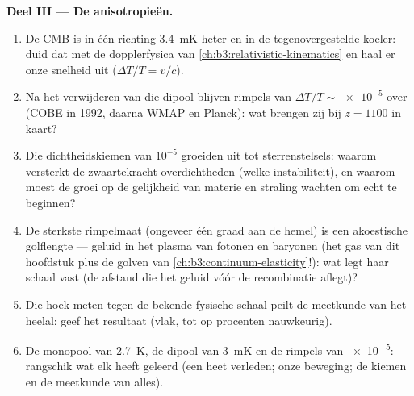\begin{problem}
\medskip\noindent\textbf{Deel III --- De anisotropieën.}
\begin{enumerate}[resume]
  \item De CMB is in één richting \qty{3.4}{mK} heter en in de
        tegenovergestelde koeler: duid dat met de dopplerfysica van
        \cref{ch:b3:relativistic-kinematics} en haal er onze snelheid uit
        ($\Delta T/T = v/c$).
  \item Na het verwijderen van die dipool blijven rimpels van $\Delta T/T \sim
        \num{e-5}$ over (COBE in 1992, daarna WMAP en Planck): wat
        brengen zij bij $z = 1100$ in kaart?
  \item Die dichtheidskiemen van $10^{-5}$ groeiden uit tot
        sterrenstelsels: waarom versterkt de zwaartekracht overdichtheden
        (welke instabiliteit), en waarom moest de groei op de gelijkheid
        van materie en straling wachten om echt te beginnen?
  \item De sterkste rimpelmaat (ongeveer één graad aan de hemel) is een
        akoestische golflengte --- geluid in het plasma van fotonen en
        baryonen (het gas van dit hoofdstuk plus de golven van
        \cref{ch:b3:continuum-elasticity}!): wat legt haar schaal vast (de
        afstand die het geluid vóór de recombinatie aflegt)?
  \item Die hoek meten tegen de bekende fysische schaal peilt de
        meetkunde van het heelal: geef het resultaat (vlak, tot op
        procenten nauwkeurig).
  \item De monopool van \qty{2.7}{K}, de dipool van \qty{3}{mK} en de
        rimpels van \num{e-5}: rangschik wat elk heeft geleerd (een heet
        verleden; onze beweging; de kiemen en de meetkunde van alles).
\end{enumerate}


\end{problem}

